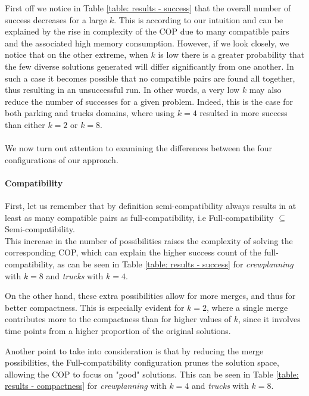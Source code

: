 First off we notice in Table \ref{table: results - success} that the overall number of success decreases for a large $k$. This is according to our intuition and can be explained by the rise in complexity of the COP due to many compatible pairs and the associated high memory consumption.
However, if we look closely, we notice that on the other extreme, when $k$ is low there is a greater probability that the few diverse solutions generated will differ significantly from one another. In such a case it becomes possible that no compatible pairs are found all together, thus resulting in an unsuccessful run.
In other words, a very low $k$ may also reduce the number of successes for a given problem.
Indeed, this is the case for both parking and trucks domains, where using $k=4$ resulted in more success than either $k=2$ or $k=8$.
\\ \\
We now turn out attention to examining the differences between the four configurations of our approach.

\paragraph{Compatibility}
First, let us remember that by definition semi-compatibility always results in at least as many compatible pairs as full-compatibility, i.e Full-compatibility $\subseteq$ Semi-compatibility. \\
This increase in the number of possibilities raises the complexity of solving the corresponding COP, which can explain the higher success count of the full-compatibility, as can be seen in Table \ref{table: results - success} for \textit{crewplanning} with $k=8$ and \textit{trucks} with $k=4$.

On the other hand, these extra possibilities allow for more merges, and thus for better compactness. This is especially evident for $k=2$, where a single merge contributes more to the compactness than for higher values of $k$, since it involves time points from a higher proportion of the original solutions. 

Another point to take into consideration is that by reducing the merge possibilities, the Full-compatibility configuration prunes the solution space, allowing the COP to focus on "good" solutions. This can be seen in Table \ref{table: results - compactness} for \textit{crewplanning} with $k=4$ and \textit{trucks} with $k=8$.

